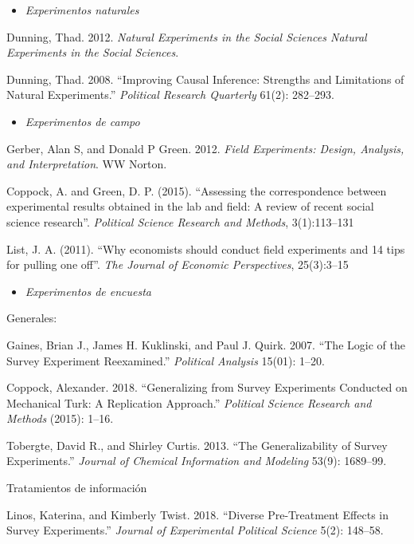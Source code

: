 \documentclass[
  12pt,
]{article}
\providecommand{\tightlist}{%
  \setlength{\itemsep}{0pt}\setlength{\parskip}{0pt}}
\begin{document}
\begin{itemize}
\tightlist
\item
  \emph{Experimentos naturales}
\end{itemize}

Dunning, Thad. 2012. \emph{Natural Experiments in the Social Sciences
Natural Experiments in the Social Sciences}.

Dunning, Thad. 2008. ``Improving Causal Inference: Strengths and
Limitations of Natural Experiments.'' \emph{Political Research
Quarterly} 61(2): 282--293.

\begin{itemize}
\tightlist
\item
  \emph{Experimentos de campo}
\end{itemize}

Gerber, Alan S, and Donald P Green. 2012. \emph{Field Experiments:
Design, Analysis, and Interpretation}. WW Norton.

Coppock, A. and Green, D. P. (2015). ``Assessing the correspondence
between experimental results obtained in the lab and field: A review of
recent social science research''. \emph{Political Science Research and
Methods}, 3(1):113--131

List, J. A. (2011). ``Why economists should conduct field experiments
and 14 tips for pulling one off''. \emph{The Journal of Economic
Perspectives}, 25(3):3--15

\begin{itemize}
\tightlist
\item
  \emph{Experimentos de encuesta}
\end{itemize}

Generales:

Gaines, Brian J., James H. Kuklinski, and Paul J. Quirk. 2007. ``The
Logic of the Survey Experiment Reexamined.'' \emph{Political Analysis}
15(01): 1--20.

Coppock, Alexander. 2018. ``Generalizing from Survey Experiments
Conducted on Mechanical Turk: A Replication Approach.'' \emph{Political
Science Research and Methods} (2015): 1--16.

Tobergte, David R., and Shirley Curtis. 2013. ``The Generalizability of
Survey Experiments.'' \emph{Journal of Chemical Information and
Modeling} 53(9): 1689--99.

Tratamientos de información

Linos, Katerina, and Kimberly Twist. 2018. ``Diverse Pre-Treatment
Effects in Survey Experiments.'' \emph{Journal of Experimental Political
Science} 5(2): 148--58.
\end{document}
